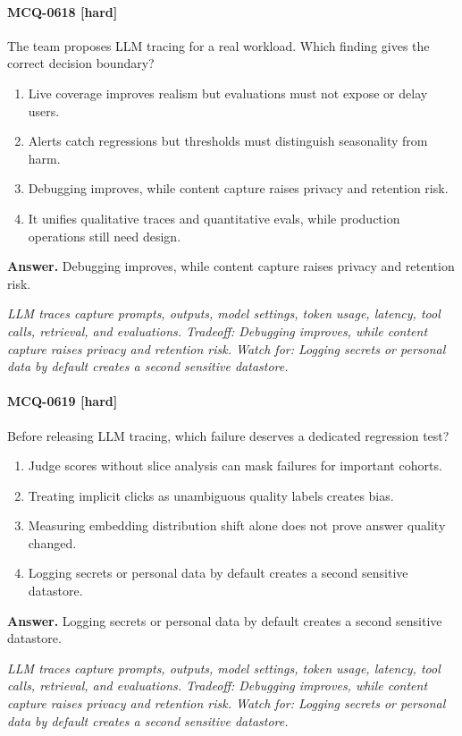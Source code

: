 \paragraph{MCQ-0618 [hard]} The team proposes LLM tracing for a real workload. Which finding gives the correct decision boundary?
\begin{enumerate}[label=\Alph*.]
\item Live coverage improves realism but evaluations must not expose or delay users.
\item Alerts catch regressions but thresholds must distinguish seasonality from harm.
\item Debugging improves, while content capture raises privacy and retention risk.
\item It unifies qualitative traces and quantitative evals, while production operations still need design.
\end{enumerate}
\noindent\textbf{Answer.} Debugging improves, while content capture raises privacy and retention risk.
\par\textit{LLM traces capture prompts, outputs, model settings, token usage, latency, tool calls, retrieval, and evaluations. Tradeoff: Debugging improves, while content capture raises privacy and retention risk. Watch for: Logging secrets or personal data by default creates a second sensitive datastore.}
\paragraph{MCQ-0619 [hard]} Before releasing LLM tracing, which failure deserves a dedicated regression test?
\begin{enumerate}[label=\Alph*.]
\item Judge scores without slice analysis can mask failures for important cohorts.
\item Treating implicit clicks as unambiguous quality labels creates bias.
\item Measuring embedding distribution shift alone does not prove answer quality changed.
\item Logging secrets or personal data by default creates a second sensitive datastore.
\end{enumerate}
\noindent\textbf{Answer.} Logging secrets or personal data by default creates a second sensitive datastore.
\par\textit{LLM traces capture prompts, outputs, model settings, token usage, latency, tool calls, retrieval, and evaluations. Tradeoff: Debugging improves, while content capture raises privacy and retention risk. Watch for: Logging secrets or personal data by default creates a second sensitive datastore.}
